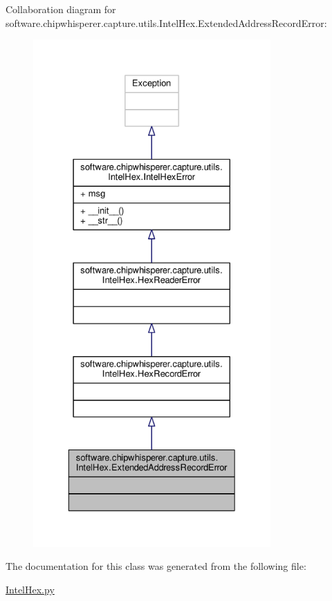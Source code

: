 Collaboration diagram for software.\+chipwhisperer.\+capture.\+utils.\+Intel\+Hex.\+Extended\+Address\+Record\+Error\+:\nopagebreak
\begin{figure}[H]
\begin{center}
\leavevmode
\includegraphics[height=550pt]{df/dda/classsoftware_1_1chipwhisperer_1_1capture_1_1utils_1_1IntelHex_1_1ExtendedAddressRecordError__coll__graph}
\end{center}
\end{figure}


The documentation for this class was generated from the following file\+:\begin{DoxyCompactItemize}
\item 
\hyperlink{IntelHex_8py}{Intel\+Hex.\+py}\end{DoxyCompactItemize}
